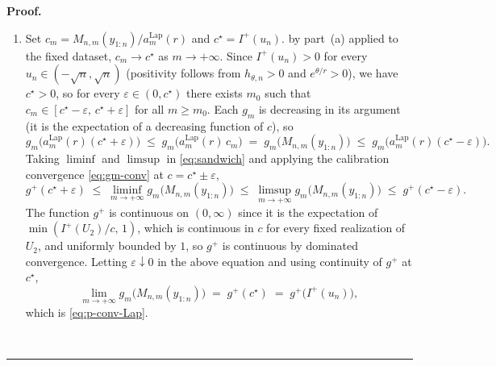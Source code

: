 \documentclass{article}%
\newenvironment{proof}[1][Proof]{\noindent\textbf{#1.} }{\ \rule{0.5em}{0.5em}}
\newcommand{\Lap}{\mathrm{Lap}}
\newcommand{\1}{\mathbf{1}}
\begin{document}
\begin{proof}
\begin{enumerate}
\item[(c)] Set $c_m = M_{n,m}(y_{1:n})/a_m^{\Lap}(r)$ and $c^\star = I^+(u_n)$.
by part~(a) applied to the fixed dataset, $c_m\to c^\star$ as
$m\to+\infty$. Since $I^+(u_n)>0$ for every $u_n\in(-\sqrt n,\sqrt n)$
(positivity follows from $h_{\theta,n}>0$ and $e^{\theta/r}>0$), we
have $c^\star>0$, so for every $\varepsilon\in(0,c^\star)$ there exists
$m_0$ such that $c_m\in[c^\star-\varepsilon,\,c^\star+\varepsilon]$
for all $m\geq m_0$. Each $g_m$ is decreasing in its argument (it is
the expectation of a decreasing function of $c$), so
\begin{equation}\label{eq:sandwich}
  g_m\!\bigl(a_m^{\Lap}(r)(c^\star+\varepsilon)\bigr)
  \;\leq\; g_m\!\bigl(a_m^{\Lap}(r)\,c_m\bigr)
  \;=\; g_m\!\bigl(M_{n,m}(y_{1:n})\bigr)
  \;\leq\; g_m\!\bigl(a_m^{\Lap}(r)(c^\star-\varepsilon)\bigr).
\end{equation}
Taking $\liminf$ and $\limsup$ in \eqref{eq:sandwich} and applying the
calibration convergence \eqref{eq:gm-conv} at $c = c^\star\pm\varepsilon$,
\[
  g^+(c^\star+\varepsilon)
  \;\leq\; \liminf_{m\to+\infty} g_m\!\bigl(M_{n,m}(y_{1:n})\bigr)
  \;\leq\; \limsup_{m\to+\infty} g_m\!\bigl(M_{n,m}(y_{1:n})\bigr)
  \;\leq\; g^+(c^\star-\varepsilon).
\]
The function $g^+$ is continuous on $(0,\infty)$ since it is the expectation of $\min(I^+(U_2)/c,\,1)$, which is continuous in $c$ for
every fixed realization of $U_2$, and uniformly bounded by $1$, so $g^+$ is continuous by dominated convergence. Letting $\varepsilon\downarrow 0$ in the above equation and using continuity of $g^+$ at $c^\star$,
\[
  \lim_{m\to+\infty} g_m\!\bigl(M_{n,m}(y_{1:n})\bigr) \;=\; g^+(c^\star)
  \;=\; g^+\!\bigl(I^+(u_n)\bigr),
\]
which is \eqref{eq:p-conv-Lap}.
\end{enumerate}
\end{proof}
\end{document}
